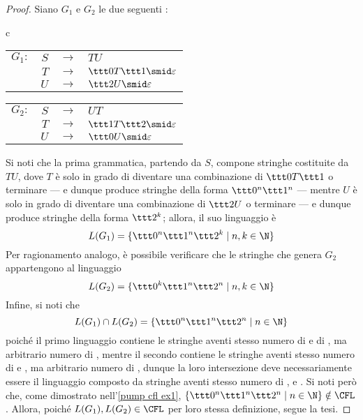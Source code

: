 \documentclass[a4paper, 12pt]{report}
\begin{document}
    \begin{proof}
        Siano $G_1$ e $G_2$ le due seguenti \CFG:

        \begin{center}
            \begin{tabular}{c}
                \begin{tabular}{crcl}
                    $G_1:$ & $S$ & $\to$ & $TU$ \\
                           & $T$ & $\to$ & $\ttt 0 T \ttt 1 \smid \varepsilon$ \\
                           & $U$ & $\to$ & $\ttt 2 U \smid \varepsilon$
                \end{tabular}
                
                \quad

                \begin{tabular}{crcl}
                    $G_2:$ & $S$ & $\to$ & $UT$ \\
                           & $T$ & $\to$ & $\ttt 1 T \ttt 2 \smid \varepsilon$ \\
                           & $U$ & $\to$ & $\ttt 0 U \smid \varepsilon$
                \end{tabular}
            \end{tabular}
        \end{center}

        Si noti che la prima grammatica, partendo da $S$, compone stringhe costituite da $TU$, dove $T$ è solo in grado di diventare una combinazione di $\ttt 0 T \ttt 1$ o terminare --- e dunque produce stringhe della forma $\ttt 0^n \ttt 1^n$ --- mentre $U$ è solo in grado di diventare una combinazione di $\ttt 2 U$ o terminare --- e dunque produce stringhe della forma $\ttt 2 ^ k$; allora, il suo linguaggio è $$L(G_1) = \{\ttt 0^n \ttt 1^n \ttt 2^k \mid n, k \in \N\}$$ Per ragionamento analogo, è possibile verificare che le stringhe che genera $G_2$ appartengono al linguaggio $$L(G_2) = \{\ttt 0^k \ttt 1^n \ttt 2^n \mid n, k \in \N\}$$ Infine, si noti che $$L(G_1) \cap L(G_2) = \{\ttt 0^n \ttt 1^n \ttt 2^n \mid n \in \N\}$$ poiché il primo linguaggio contiene le stringhe aventi stesso numero di  e di , ma arbitrario numero di , mentre il secondo contiene le stringhe aventi stesso numero di  e , ma arbitrario numero di , dunque la loro intersezione deve necessariamente essere il linguaggio composto da stringhe aventi stesso numero di ,  e . Si noti però che, come dimostrato nell'\cref{pump cfl ex1}, $\{\ttt 0^n \ttt 1^n \ttt 2^n \mid n \in \N\} \notin \mathrm{\CFL}$. Allora, poiché $L(G_1), L(G_2) \in \mathrm{\CFL}$ per loro stessa definizione, segue la tesi.
    \end{proof}
\end{document}
